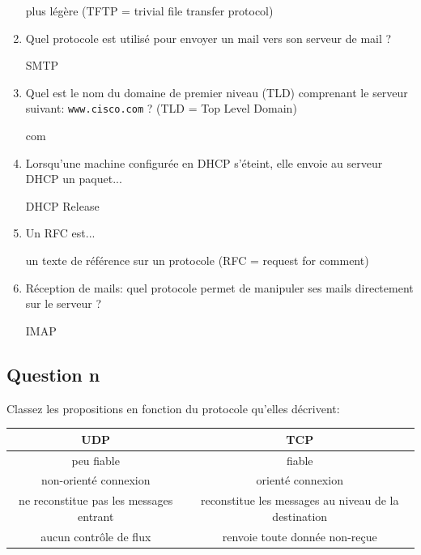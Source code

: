 \documentclass[a4paper]{article}
\begin{document}
\begin{enumerate}
\begin{example}
        plus légère (TFTP = trivial file transfer protocol)
    \end{example}
    \item Quel protocole est utilisé pour envoyer un mail vers son serveur de mail ?
    \begin{example}
        SMTP
    \end{example}
    \item Quel est le nom du domaine de premier niveau (TLD) comprenant le serveur suivant: \texttt{www.cisco.com} ? (TLD = Top Level Domain)
    \begin{example}
        com
    \end{example}
    \item Lorsqu’une machine configurée en DHCP s’éteint, elle envoie au serveur DHCP un paquet...
    \begin{example}
        DHCP Release
    \end{example}
    \item Un RFC est...
    \begin{example}
        un texte de référence sur un protocole (RFC = request for comment)
    \end{example}
    \item Réception de mails: quel protocole permet de manipuler ses mails directement sur le serveur ?
    \begin{example}
        IMAP
    \end{example}
\end{enumerate}










\subsection{Question n}





Classez les propositions en fonction du protocole qu’elles décrivent:
\begin{center}
\begin{tabular}{|c|c|} \hline
    UDP & TCP \\ \hline
    peu fiable & fiable \\
    non-orienté connexion & orienté connexion \\
    ne reconstitue pas les messages entrant & reconstitue les messages au niveau de la destination \\
    aucun contrôle de flux & renvoie toute donnée non-reçue \\ \hline
\end{tabular}
\end{center}
\end{document}
